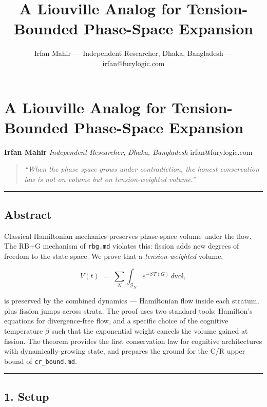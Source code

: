 \documentclass[
  11pt,
  a4paper,
]{article}
\title{A Liouville Analog for Tension-Bounded Phase-Space Expansion}
\author{Irfan Mahir --- Independent Researcher, Dhaka, Bangladesh ---
irfan@furylogic.com}
\date{}
\begin{document}
\maketitle

{
\hypersetup{linkcolor=}
\setcounter{tocdepth}{3}
\tableofcontents
}
\section{A Liouville Analog for Tension-Bounded Phase-Space
Expansion}\label{a-liouville-analog-for-tension-bounded-phase-space-expansion}

\textbf{Irfan Mahir} \emph{Independent Researcher, Dhaka, Bangladesh}
irfan@furylogic.com

\begin{quote}
\emph{``When the phase space grows under contradiction, the honest
conservation law is not on volume but on tension-weighted volume.''}
\end{quote}

\begin{center}\rule{0.5\linewidth}{0.5pt}\end{center}

\subsection{Abstract}\label{abstract}

Classical Hamiltonian mechanics preserves phase-space volume under the
flow. The RB+G mechanism of \texttt{rbg.md} violates this: fission adds
new degrees of freedom to the state space. We prove that a
\emph{tension-weighted} volume,

\[
V(t) \;=\; \sum_{N} \int_{\mathcal{G}_N} e^{-\beta \, T(G)} \, d\text{vol},
\]

is preserved by the combined dynamics --- Hamiltonian flow inside each
stratum, plus fission jumps across strata. The proof uses two standard
tools: Hamilton's equations for divergence-free flow, and a specific
choice of the cognitive temperature \(\beta\) such that the exponential
weight cancels the volume gained at fission. The theorem provides the
first conservation law for cognitive architectures with
dynamically-growing state, and prepares the ground for the C/R upper
bound of \texttt{cr\_bound.md}.

\begin{center}\rule{0.5\linewidth}{0.5pt}\end{center}

\subsection{1. Setup}\label{setup}
\end{document}
